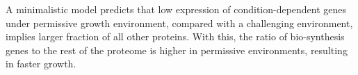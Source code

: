 \label{fig:model}
A minimalistic model predicts that low expression of condition-dependent genes under permissive growth environment, compared with a challenging environment, implies larger fraction of all other proteins.
With this, the ratio of bio-synthesis genes to the rest of the proteome is higher in permissive environments, resulting in faster growth.
